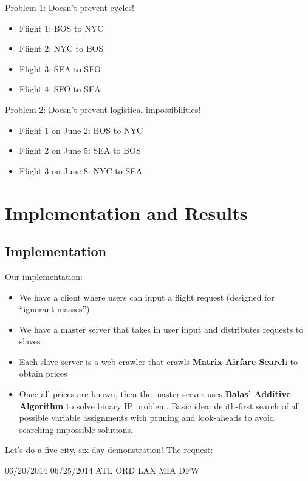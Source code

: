 \documentclass[10pt, xcolor=svgnames]{beamer}
\begin{document}
\begin{frame}
Problem 1: Doesn't prevent cycles!
\begin{itemize}
    \item Flight 1: BOS to NYC
    \item Flight 2: NYC to BOS 
    \item Flight 3: SEA to SFO 
    \item Flight 4: SFO to SEA
\end{itemize}
\pause
Problem 2: Doesn't prevent logistical impossibilities!
\begin{itemize}
    \item Flight 1 on June 2: BOS to NYC
    \item Flight 2 on June 5: SEA to BOS
    \item Flight 3 on June 8: NYC to SEA
\end{itemize}
\end{frame}


\section{Implementation and Results}

\subsection{Implementation}

\begin{frame}
Our implementation:

\begin{itemize}
    \item We have a client where users can input a flight request (designed for ``ignorant masses'')
    \pause
    \item We have a master server that takes in user input and distributes requests to slaves
    \pause
    \item Each slave server is a web crawler that crawls \textbf{Matrix Airfare Search} to obtain prices
    \pause
    \item Once all prices are known, then the master server uses \textbf{Balas' Additive Algorithm} to solve binary IP problem. Basic idea:
    depth-first search of all possible variable assignments with pruning and look-aheads to avoid searching impossible solutions.
\end{itemize}
\end{frame}

\begin{frame}
Let's do a five city, six day demonstration! The request:
\begin{center}
{\large 06/20/2014 06/25/2014 ATL ORD LAX MIA DFW}
\end{center}
\end{frame}
\end{document}
